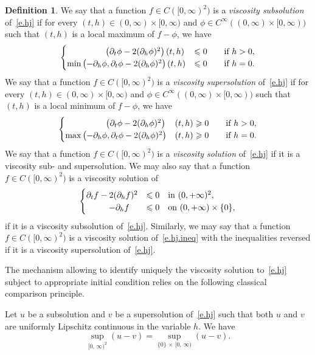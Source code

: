 \documentclass[10pt]{amsart}
\theoremstyle{definition}\newtheorem{defi}[theo]{Definition}\newtheorem{rema}[theo]{Remark}\newtheorem{exam}[theo]{Example}\newtheorem{exem}[theo]{Example}\newtheorem{nota}[theo]{Notation}
\newcommand{\1}{\mathds{1}}
\renewcommand{\le}{\leqslant}
\renewcommand{\ge}{\geqslant}
\begin{document}
\begin{defi}\label{def.visc}
We say that a function $f \in C([0,\infty)^2)$ is a \emph{viscosity subsolution} of~\eqref{e.hj} if for every $(t,h) \in (0,\infty)\times [0,\infty)$ and $\phi \in C^\infty((0,\infty)\times [0,\infty))$ such that $(t,h)$ is a local maximum of $f-\phi$, we have
\[
\begin{cases}
\mkern82mu\left(\partial_t \phi - 2(\partial_h \phi)^2\right)(t,h)& \le 0  \qquad \text{if } h > 0, \\
\min \left(-\partial_h \phi,\partial_t \phi - 2(\partial_h \phi)^2 \right)(t,h)& \le 0  \qquad \text{if } h = 0.
\end{cases}
\]
We say that a function $f \in C([0,\infty)^2)$ is a \emph{viscosity supersolution} of~\eqref{e.hj} if for every $(t,h) \in (0,\infty)\times [0,\infty)$ and $\phi \in C^\infty((0,\infty)\times [0,\infty))$ such that $(t,h)$ is a local minimum of $f-\phi$, we have
\[
\begin{cases}
\mkern86mu\left(\partial_t \phi - 2(\partial_h \phi)^2\right)&(t,h) \ge 0  \qquad \text{if } h > 0, \\
\max \left(-\partial_h \phi, \partial_t \phi - 2(\partial_h \phi)^2\right)&(t,h) \ge 0  \qquad \text{if } h = 0.
\end{cases}
\]
We say that a function $f \in C([0,\infty)^2)$ is a \emph{viscosity solution} of~\eqref{e.hj} if it is a viscosity sub- and supersolution. We may also say that a function $f \in C([0,\infty)^2)$ is a viscosity solution of
\begin{equation}\label{e.hj.ineq}
\begin{cases}
\partial_t f - 2(\partial_{h} f)^2 & \le 0 \quad \text{in } (0,+\infty)^2, \\
\mkern48mu- \partial_h f & \le 0 \quad  \text{on } (0,+\infty) \times \{0\},
\end{cases}
\end{equation}
if it is a viscosity subsolution of~\eqref{e.hj}. Similarly, we may say that a function $f \in C([0,\infty)^2)$ is a viscosity solution of~\eqref{e.hj.ineq} with the inequalities reversed if it is a viscosity supersolution of~\eqref{e.hj}.
\end{defi}

The mechanism allowing to identify uniquely the viscosity solution to~\eqref{e.hj} subject to appropriate initial condition relies on the following classical comparison principle.

\begin{prop}\label{p.comparison}
Let $u$ be a subsolution and $v$ be a supersolution of~\eqref{e.hj} such that both $u$ and $v$ are uniformly Lipschitz continuous in the variable $h$. We have
\[
\sup_{[0,\,\infty)^2} (u-v) = \sup_{\{0\}\,\times\,[0,\,\infty)} (u-v).
\]
\end{prop}
\end{document}
